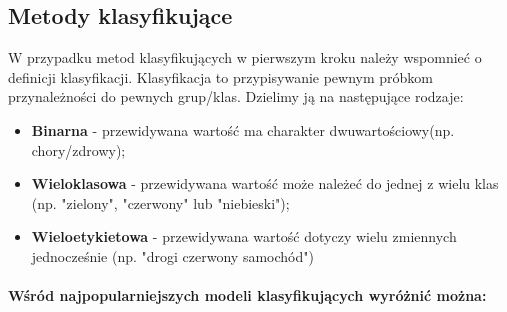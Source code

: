 \documentclass[12pt,a4paper]{article}
\begin{document}



\subsection{Metody klasyfikujące}
W przypadku metod klasyfikujących \cite{Podrecznik-AI} w pierwszym kroku należy wspomnieć o definicji klasyfikacji. Klasyfikacja to przypisywanie pewnym próbkom przynależności do pewnych grup/klas. Dzielimy ją na następujące rodzaje:

\begin{itemize}
    \item \textbf{Binarna} - przewidywana wartość ma charakter dwuwartościowy(np. chory/zdrowy);
    \item \textbf{Wieloklasowa} - przewidywana wartość może należeć do jednej z wielu klas (np. "zielony", "czerwony" lub "niebieski");
    \item \textbf{Wieloetykietowa} - przewidywana wartość dotyczy wielu zmiennych jednocześnie (np. "drogi czerwony samochód") 
\end{itemize}

\paragraph{Wśród najpopularniejszych modeli klasyfikujących wyróżnić można:}
\end{document}

